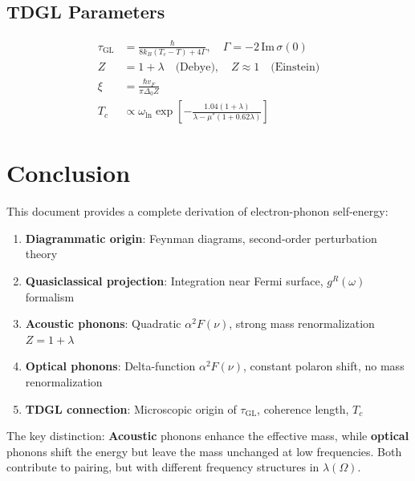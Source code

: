 \documentclass[12pt]{article}
\begin{document}
\subsection{TDGL Parameters}

\begin{align}
\tau_{\text{GL}} &= \frac{\hbar}{8k_B(T_c - T) + 4\Gamma}, \quad \Gamma = -2\,\text{Im}\,\sigma(0) \\
Z &= 1 + \lambda \quad \text{(Debye)}, \quad Z \approx 1 \quad \text{(Einstein)} \\
\xi &= \frac{\hbar v_F}{\pi\Delta_0 Z} \\
T_c &\propto \omega_{\text{ln}} \exp\left[-\frac{1.04(1+\lambda)}{\lambda - \mu^*(1 + 0.62\lambda)}\right]
\end{align}

\section{Conclusion}

This document provides a complete derivation of electron-phonon self-energy:

\begin{enumerate}
\item \textbf{Diagrammatic origin}: Feynman diagrams, second-order perturbation theory
\item \textbf{Quasiclassical projection}: Integration near Fermi surface, $g^R(\omega)$ formalism
\item \textbf{Acoustic phonons}: Quadratic $\alpha^2F(\nu)$, strong mass renormalization $Z = 1 + \lambda$
\item \textbf{Optical phonons}: Delta-function $\alpha^2F(\nu)$, constant polaron shift, no mass renormalization
\item \textbf{TDGL connection}: Microscopic origin of $\tau_{\text{GL}}$, coherence length, $T_c$
\end{enumerate}

The key distinction: \textbf{Acoustic} phonons enhance the effective mass, while \textbf{optical} phonons shift the energy but leave the mass unchanged at low frequencies. Both contribute to pairing, but with different frequency structures in $\lambda(\Omega)$.
\end{document}

